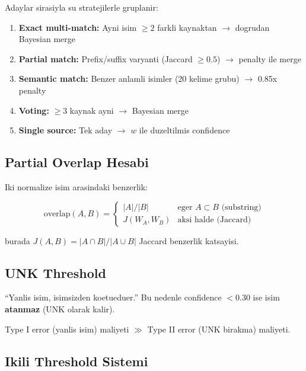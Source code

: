 \documentclass[12pt,a4paper,oneside]{book}
\theoremstyle{definition}
\begin{document}
Adaylar sirasiyla su stratejilerle gruplanir:

\begin{enumerate}
\item \textbf{Exact multi-match:} Ayni isim $\geq 2$ farkli kaynaktan $\to$ dogrudan Bayesian merge
\item \textbf{Partial match:} Prefix/suffix varyanti (Jaccard $\geq 0.5$) $\to$ penalty ile merge
\item \textbf{Semantic match:} Benzer anlamli isimler (20 kelime grubu) $\to$ 0.85x penalty
\item \textbf{Voting:} $\geq 3$ kaynak ayni $\to$ Bayesian merge
\item \textbf{Single source:} Tek aday $\to$ $w$ ile duzeltilmis confidence
\end{enumerate}

\subsection{Partial Overlap Hesabi}

Iki normalize isim arasindaki benzerlik:

\begin{equation}
\text{overlap}(A, B) = \begin{cases}
|A| / |B| & \text{eger } A \subset B \text{ (substring)} \\
J(W_A, W_B) & \text{aksi halde (Jaccard)}
\end{cases}
\end{equation}

burada $J(A, B) = |A \cap B| / |A \cup B|$ Jaccard benzerlik katsayisi.

\subsection{UNK Threshold}

\begin{uyari}
``Yanlis isim, isimsizden koetueduer.'' Bu nedenle confidence $< 0.30$ ise isim \textbf{atanmaz} (UNK olarak kalir).

Type I error (yanlis isim) maliyeti $\gg$ Type II error (UNK bira\-kma) maliyeti.
\end{uyari}

\subsection{Ikili Threshold Sistemi}
\end{document}
